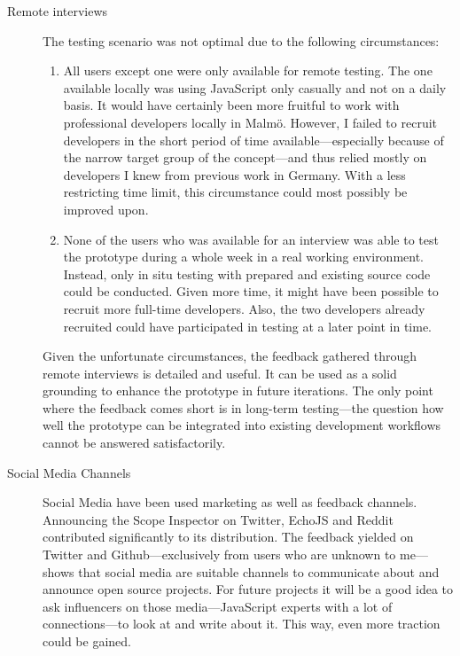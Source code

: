 \begin{description}
\item[Remote interviews]
The testing scenario was not optimal due to the following circumstances:

\begin{enumerate}
\def\labelenumi{\arabic{enumi}.}
\itemsep1pt\parskip0pt
\item
  All users except one were only available for remote testing. The one
  available locally was using JavaScript only casually and not on a
  daily basis. It would have certainly been more fruitful to work with
  professional developers locally in Malmö. However, I failed to recruit
  developers in the short period of time available—especially because of
  the narrow target group of the concept—and thus relied mostly on
  developers I knew from previous work in Germany. With a less
  restricting time limit, this circumstance could most possibly be
  improved upon.
\item
  None of the users who was available for an interview was able to test
  the prototype during a whole week in a real working environment.
  Instead, only in situ testing with prepared and existing source code
  could be conducted. Given more time, it might have been possible to
  recruit more full-time developers. Also, the two developers already
  recruited could have participated in testing at a later point in time.
\end{enumerate}

Given the unfortunate circumstances, the feedback gathered through
remote interviews is detailed and useful. It can be used as a solid
grounding to enhance the prototype in future iterations. The only point
where the feedback comes short is in long-term testing—the question how
well the prototype can be integrated into existing development workflows
cannot be answered satisfactorily.
\item[Social Media Channels]
Social Media have been used marketing as well as feedback channels.
Announcing the Scope Inspector on Twitter, EchoJS and Reddit contributed
significantly to its distribution. The feedback yielded on Twitter and
Github—exclusively from users who are unknown to me—shows that social
media are suitable channels to communicate about and announce open
source projects. For future projects it will be a good idea to ask
influencers on those media—JavaScript experts with a lot of
connections—to look at and write about it. This way, even more traction
could be gained.
\end{description}

